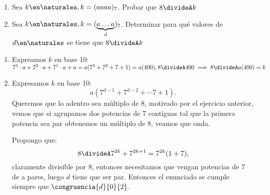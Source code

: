 \begin{enunciado}{\ejercicio}
  \begin{enumerate}[label=(\alph*)]
    \item Sea $k \en \naturales, k = (aaaa)_7$. Probar que $8 \divideA k$
    \item Sea $k \en \naturales, k = (\underbrace{a \ldots a}_{d})_7$. Determinar para qué valores de $d \en \naturales$
          se tiene que $8 \divideA k$
  \end{enumerate}
\end{enunciado}

\begin{enumerate}[label=(\alph*)]
  \item Expreamos $k$ en base 10: $7^3 \cdot a + 7^2 \cdot a + 7^1 \cdot a + a = a(7^3 + 7^2 + 7 + 1)
          = a(400), 8 \divideA 400 \implies 8 \divideA a(400) = k$

  \item Expresamos $k$ en base 10:
        $$
          a(7^{d-1} + 7^{d-2} + \cdots 7 + 1).
        $$
        Queremos que lo adentro sea múltiplo de 8, motivado por el ejercicio anterior,
        vemos que si agrupamos dos potencias de 7 contiguas tal que la primera potencia sea
        par obtenemos un múltiplo de 8, veamos que onda.

        Propongo que:
        $$
          8 \divideA 7^{2k} + 7^{2k + 1} = 7^{2k}(1 + 7),
        $$
        claramente divisible por 8, entonces necesitamos que vengan potencias de 7 de a pares,
        luego $d$ tiene que ser par. Entonces el enunciado se cumple siempre que $\congruencia{d}{0}{2}$.
\end{enumerate}

\begin{aportes}
  \item {}
\end{aportes}
